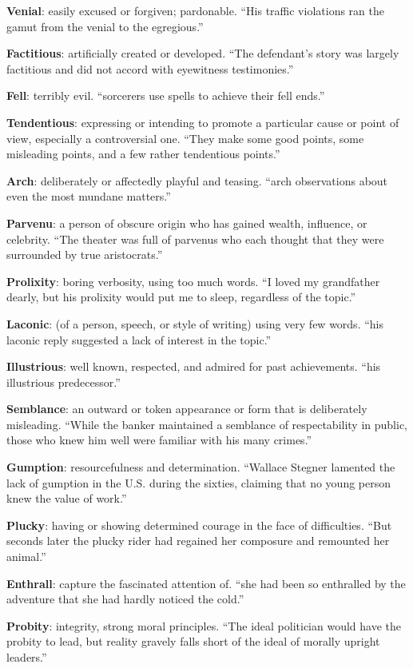 \documentclass[12pt, a4paper]{ximera}
\begin{document}
\textbf{Venial}: easily excused or forgiven; pardonable. ``His traffic violations ran the gamut from the venial to the egregious.''

\textbf{Factitious}: artificially created or developed. ``The defendant’s story was largely factitious and did not accord with eyewitness testimonies.''

\textbf{Fell}: terribly evil. ``sorcerers use spells to achieve their fell ends.''

\textbf{Tendentious}: expressing or intending to promote a particular cause or point of view, especially a controversial one. ``They make some good points, some misleading points, and a few rather tendentious points.''

\textbf{Arch}: deliberately or affectedly playful and teasing. ``arch observations about even the most mundane matters.''

\textbf{Parvenu}: a person of obscure origin who has gained wealth, influence, or celebrity. ``The theater was full of parvenus who each thought that they were surrounded by true aristocrats.''

\textbf{Prolixity}: boring verbosity, using too much words. ``I loved my grandfather dearly, but his prolixity would put me to sleep, regardless of the topic.''

\textbf{Laconic}: (of a person, speech, or style of writing) using very few words. ``his laconic reply suggested a lack of interest in the topic.''

\textbf{Illustrious}: well known, respected, and admired for past achievements. ``his illustrious predecessor.''

\textbf{Semblance}: an outward or token appearance or form that is deliberately misleading. ``While the banker maintained a semblance of respectability in public, those who knew him well were familiar with his many crimes.''

\textbf{Gumption}: resourcefulness and determination. ``Wallace Stegner lamented the lack of gumption in the U.S. during the sixties, claiming that no young person knew the value of work.''

\textbf{Plucky}: having or showing determined courage in the face of difficulties. ``But seconds later the plucky rider had regained her composure and remounted her animal.''

\textbf{Enthrall}: capture the fascinated attention of. ``she had been so enthralled by the adventure that she had hardly noticed the cold.''

\textbf{Probity}: integrity, strong moral principles. ``The ideal politician would have the probity to lead, but reality gravely falls short of the ideal of morally upright leaders.''
\end{document}
